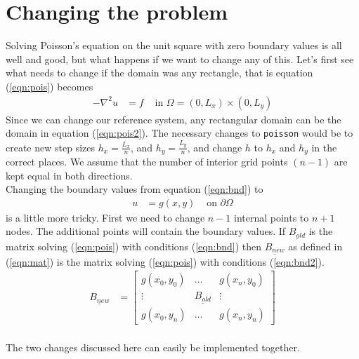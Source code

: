 \documentclass{article}
\begin{document}
\section{Changing the problem}
Solving Poisson's equation on the unit square with zero boundary values is all well and good, but what happens if we want to change any of this. Let's first see what needs to change if the domain was any rectangle, that is equation (\ref{eqn:pois}) becomes
\begin{align}
  -\nabla^2 u & = f 	&\text{ in } \Omega = (0,L_x) \times (0,L_y)  \label{eqn:pois2}
\end{align}
Since we can change our reference system, any rectangular domain can be the domain in equation (\ref{eqn:pois2}). The necessary changes to \texttt{poisson} would be to create new step sizes $h_x = \frac{L_x}{n}$, and $h_y = \frac{L_y}{n}$, and change $h$ to $h_x$ and $h_y$ in the correct places. We assume that the number of interior grid points $(n-1)$ are kept equal in both directions.\\
Changing the boundary values from equation (\ref{eqn:bnd}) to
\begin{align}
 u & = g(x,y) 			&\text{ on } \partial \Omega \label{eqn:bnd2}
\end{align}
is a little more tricky. First we need to change $n-1$ internal points to $n+1$ nodes. The additional points will contain the boundary values. If $\underline{B_{old}}$ is the matrix solving (\ref{eqn:pois}) with conditions (\ref{eqn:bnd}) then $\underline{B_{new}}$ as defined in (\ref{eqn:mat}) is the matrix solving (\ref{eqn:pois}) with conditions (\ref{eqn:bnd2}).\\
\begin{align}
\underline{B_{new}} &= 
\begin{bmatrix}  
 g(x_0,y_0) & \hdots & g(x_n,y_0) \\
 \vdots &  \underline{ B_{old}} & \vdots \\
 g(x_0,y_n) & \hdots &  g(x_n,y_n)
\end{bmatrix}
\label{eqn:mat}
\end{align}
\\The two changes discussed here can easily be implemented together.

\end{document}
